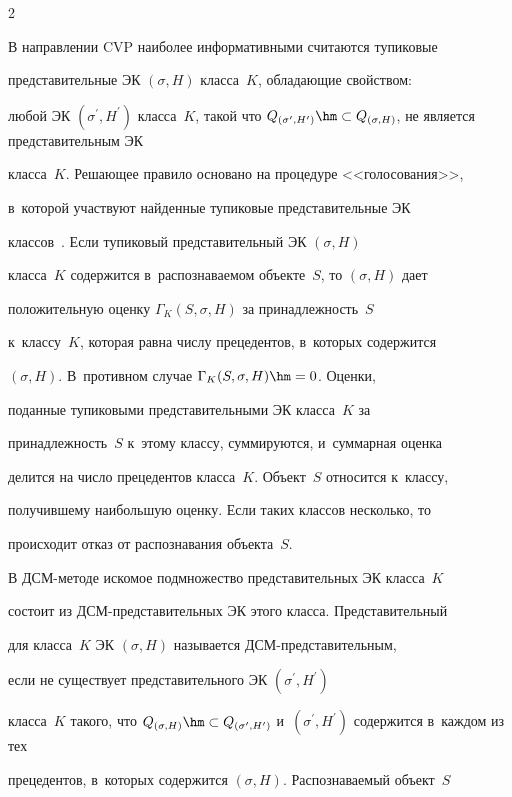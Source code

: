 \begin{multicols}{2}
  


  В направлении CVP наиболее информативными считаются тупиковые 


представительные ЭК $(\sigma, H)$  класса~$K$, обладающие свойством: 


любой ЭК $(\sigma^\prime, H^\prime)$ класса~$K$, такой что $Q_{(\sigma^\prime, 


H^\prime)} \hm\subset Q_{(\sigma, H)}$, не является представительным ЭК 


класса~$K$. Решающее правило основано на процедуре <<голосования>>, 


в~которой участ\-ву\-ют найденные тупиковые представительные ЭК 


классов~\cite{11-duk}. Если тупиковый представительный ЭК $(\sigma, H)$  


класса~$K$ содержится в~распознаваемом объекте~$S$, то $(\sigma, H)$ дает 


положительную оценку $\Gamma_K(S,\sigma, H)$ за принадлежность~$S$ 


к~классу~$K$, которая равна числу прецедентов, в~которых содержится 


$(\sigma, H)$. В~противном случае $\Gamma_K(S,\sigma, H)\hm=0$. Оценки, 


поданные тупиковыми представительными ЭК класса~$K$ за 


принадлежность~$S$  к~этому классу, суммируются, и~суммарная оценка 


делится на число прецедентов класса~$K$. Объект~$S$ относится к~классу, 


получившему наибольшую оценку. Если таких классов несколько, то 


происходит отказ от распознавания объекта~$S$.


  


  В ДСМ-методе искомое подмножество представительных ЭК класса~$K$ 


состоит из ДСМ-пред\-ста\-ви\-тель\-ных ЭК этого класса. Представительный 


для класса~$K$ ЭК $(\sigma, H)$ называется ДСМ-пред\-ста\-ви\-тель\-ным, 


если не существует представительного ЭК $(\sigma^\prime, H^\prime)$ 


класса~$K$ такого, что $Q_{(\sigma, H)} \hm\subset Q_{(\sigma^\prime, 


H^\prime)}$ и~$(\sigma^\prime, H^\prime)$ содержится в~каждом из тех 


прецедентов, в~которых содержится $(\sigma, H)$. Распознаваемый объект~$S$ 



\end{multicols}

